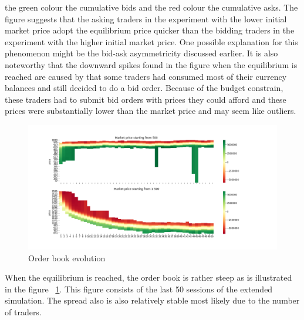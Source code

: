 the green colour the cumulative bids and the red colour the cumulative asks.
The figure suggests that the asking traders in the experiment with the lower initial market price
adopt the equilibrium price quicker than the bidding traders in the experiment with the higher initial market 
price. One possible explanation for this phenomenon might be the bid-ask asymmetricity
discussed earlier. It is also noteworthy that the downward spikes found in the figure when the equilibrium
is reached are caused by that some traders had consumed most of their currency balances and still decided 
to do a bid order. Because of the budget constrain, these traders had to submit bid orders with prices
they could afford and these prices were substantially lower than the market price and may seem like outliers.


\begin{figure}[H]
    \includegraphics[width=\linewidth]{plots/basic_order_book_evo.png}
    \caption{Order book evolution}
    \label{fig:basic_orderbook_evo}
\end{figure}

When the equilibrium is reached, the order book is rather steep as is illustrated in the figure
~\ref{fig:basic_orderbook_evo}. This figure consists of the last 50 sessions of the extended simulation.
The spread also is also relatively stable most likely due to the number of traders. 

